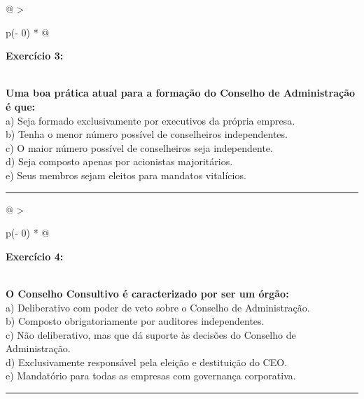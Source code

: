 \documentclass[
]{book}
\begin{document}
\begin{longtable}[]{@{}
  >{\raggedright\arraybackslash}p{(\columnwidth - 0\tabcolsep) * }@{}}
\toprule\noalign{}
\begin{minipage}[b]{\linewidth}\raggedright
\textbf{Exercício 3:}
\end{minipage} \\
\midrule\noalign{}
\endhead
\bottomrule\noalign{}
\endlastfoot
\textbf{Uma boa prática atual para a formação do Conselho de Administração é que:} \\
a) Seja formado exclusivamente por executivos da própria empresa. \\
b) Tenha o menor número possível de conselheiros independentes. \\
c) O maior número possível de conselheiros seja independente. \\
d) Seja composto apenas por acionistas majoritários. \\
e) Seus membros sejam eleitos para mandatos vitalícios. \\
\end{longtable}

\begin{center}\rule{0.5\linewidth}{0.5pt}\end{center}

\begin{longtable}[]{@{}
  >{\raggedright\arraybackslash}p{(\columnwidth - 0\tabcolsep) * }@{}}
\toprule\noalign{}
\begin{minipage}[b]{\linewidth}\raggedright
\textbf{Exercício 4:}
\end{minipage} \\
\midrule\noalign{}
\endhead
\bottomrule\noalign{}
\endlastfoot
\textbf{O Conselho Consultivo é caracterizado por ser um órgão:} \\
a) Deliberativo com poder de veto sobre o Conselho de Administração. \\
b) Composto obrigatoriamente por auditores independentes. \\
c) Não deliberativo, mas que dá suporte às decisões do Conselho de Administração. \\
d) Exclusivamente responsável pela eleição e destituição do CEO. \\
e) Mandatório para todas as empresas com governança corporativa. \\
\end{longtable}

\begin{center}\rule{0.5\linewidth}{0.5pt}\end{center}
\end{document}
